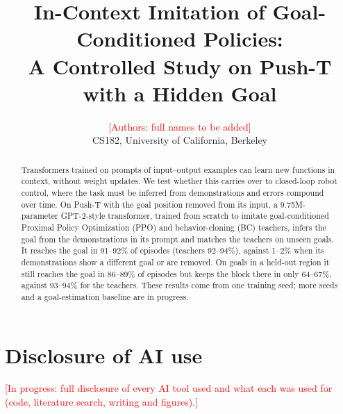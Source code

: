 \documentclass[10pt]{article}
\title{In-Context Imitation of Goal-Conditioned Policies:\\ A Controlled Study on Push-T with a Hidden Goal}
\author{
  \textcolor{red}{[Authors: full names to be added]}\\  %
  CS182, University of California, Berkeley
}
\date{}
\providecommand{\inprogress}[1]{\textcolor{red}{[In progress: #1]}}
\begin{document}
\maketitle

\begin{abstract}
Transformers trained on prompts of input--output examples can learn new functions in context, without weight updates. We test
whether this carries over to closed-loop robot control, where the task must be inferred from demonstrations and errors compound
over time. On Push-T with the goal position removed from its input, a 9.75M-parameter GPT-2-style transformer, trained from scratch
to imitate goal-conditioned Proximal Policy Optimization (PPO) and behavior-cloning (BC) teachers, infers the goal from the
demonstrations in its prompt and matches the teachers on unseen goals. It reaches the goal in 91--92\% of episodes (teachers
92--94\%), against 1--2\% when its demonstrations show a different goal or are removed. On goals in a held-out region it still
reaches the goal in 86--89\% of episodes but keeps the block there in only 64--67\%, against 93--94\% for the teachers. These results
come from one training seed; more seeds and a goal-estimation baseline are in progress.
\end{abstract}










\appendix
\section{Disclosure of AI use}
\label{app:ai}
\inprogress{full disclosure of every AI tool used and what each was used for (code, literature search, writing and figures).}
\end{document}
